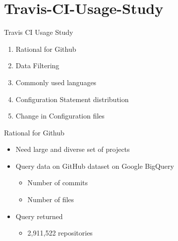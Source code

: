 \documentclass[aspectratio=169,xcolor=dvipsnames]{beamer}
\begin{document}
\section{Travis-CI-Usage-Study}
\begin{frame}{Travis CI Usage Study}
    \begin{enumerate}
        \item Rational for Github
        \item Data Filtering
        \item Commonly used languages
        \item Configuration Statement distribution
        \item Change in Configuration files
    \end{enumerate}
\end{frame}
\begin{frame}{Rational for Github}
    \begin{itemize}
        \item Need large and diverse set of projects
        \item Query data on GitHub dataset on Google BigQuery
        \begin{itemize}
            \item Number of commits
            \item Number of files
        \end{itemize}
        \item Query returned 
        \begin{itemize}
            \item 2,911,522 repositories
        \end{itemize}
    \end{itemize}
\end{frame}
\end{document}
